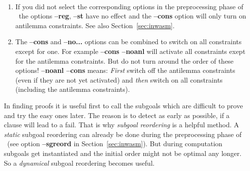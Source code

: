 \begin{remark}\label{rem:constr-options}
\
\begin{enumerate}
      \item{If you did not select  the
            corresponding  options  in the preprocessing phase of
            \inw\ the options {\bf --reg}, {\bf --st} have no effect and
            the {\bf --cons} option will only turn on antilemma
            constraints. See also Section~\ref{sec:inwasm}.} 
      \item{The {\bf --cons} and {\bf --no...} options can be combined
            to switch on all constraints except for one. For example
            {\bf --cons --noanl} will activate all constraints exept for
            the antilemma constraints. But do not turn around the order
            of these options! \linebreak
            {\bf --noanl --cons} means: {\it First\/}
            switch off the antilemma constraints (even if they are not
            yet activated) and {\it then\/} switch on all constraints
            (including the antilemma constraints).}
\end{enumerate}
\end{remark}

In finding proofs it is useful first to call the subgoals which are
difficult to prove and try the easy ones later. The reason is to
detect as early as possible, if a clause will lead to a fail. That is
why {\it subgoal reordering\/} is a helpful method. A 
{\it static\/} subgoal reordering can already be done during the
preprocessing phase of \inw\ (see option {\bf --sgreord} in
Section~\ref{sec:inwasm}). But during computation subgoals get
instantiated and the initial order might not be optimal any longer. So
a {\it dynamical\/} subgoal reordering becomes useful.

